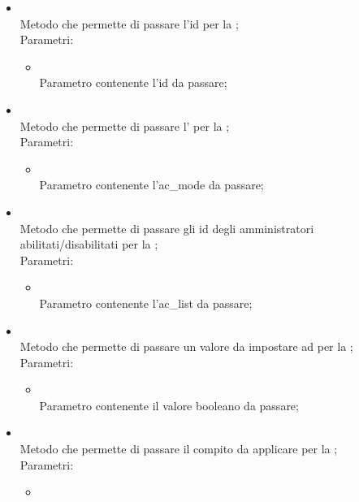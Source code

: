 \begin{itemize}
\begin{itemize}
		\item[]  \\
		Metodo che permette di passare l'id per la ;\\
		Parametri:
		\begin{itemize}
			\item {} \\
			Parametro contenente l'id da passare;
		\end{itemize}
		\item[]  \\
		Metodo che permette di passare l' per la ;\\
		Parametri:
		\begin{itemize}
			\item {} \\
			Parametro contenente l'ac\_mode da passare;
		\end{itemize}
		\item[]  \\
		Metodo che permette di passare gli id degli amministratori abilitati/disabilitati per la ;\\
		Parametri:
		\begin{itemize}
			\item {} \\
			Parametro contenente l'ac\_list da passare;
		\end{itemize}
		\item[]  \\
		Metodo che permette di passare un valore da impostare ad  per la ;\\
		Parametri:
		\begin{itemize}
			\item {} \\
			Parametro contenente il valore booleano da passare;
		\end{itemize}
		\item[]  \\
		Metodo che permette di passare il compito da applicare per la ;\\
		Parametri:
		\begin{itemize}
			\item {} \\

\end{itemize}
\end{itemize}
\end{itemize}
